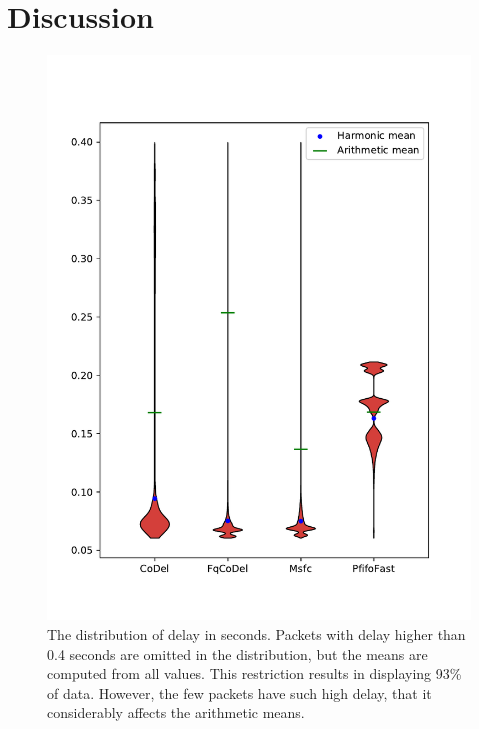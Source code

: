 \section{Discussion}









\begin{figure}
	\centering
	\includegraphics[width=137mm]{drawings/overall-delay-down}
	\caption{The distribution of delay in seconds. Packets with delay higher than 0.4 seconds are omitted in the distribution, but the means are computed from all values. This restriction results in displaying 93\% of data. However, the few packets have such high delay, that it considerably affects the arithmetic means. }
	\label{fig:overall_delay}
\end{figure}

